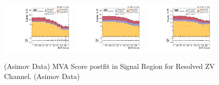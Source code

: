 \begin{figure}[!ht]
  \centering
  \includegraphics[width=0.32\textwidth]{analysis_plots/2016_zjj.sr_l_postfit/sr_l_postfit/mva_score_zjj_var2_log.pdf}
  \includegraphics[width=0.32\textwidth]{analysis_plots/2017_zjj.sr_l_postfit/sr_l_postfit/mva_score_zjj_var2_log.pdf}
  \includegraphics[width=0.32\textwidth]{analysis_plots/2018_zjj.sr_l_postfit/sr_l_postfit/mva_score_zjj_var2_log.pdf} \\
  \caption[MVA Score postfit in Signal Region for Resolved ZV Channel]%
  {(Asimov Data) MVA Score postfit in Signal Region for Resolved ZV Channel. (Asimov Data)}%
  \label{fig:zjj-sr-l-mva-score-postfit}
\end{figure}